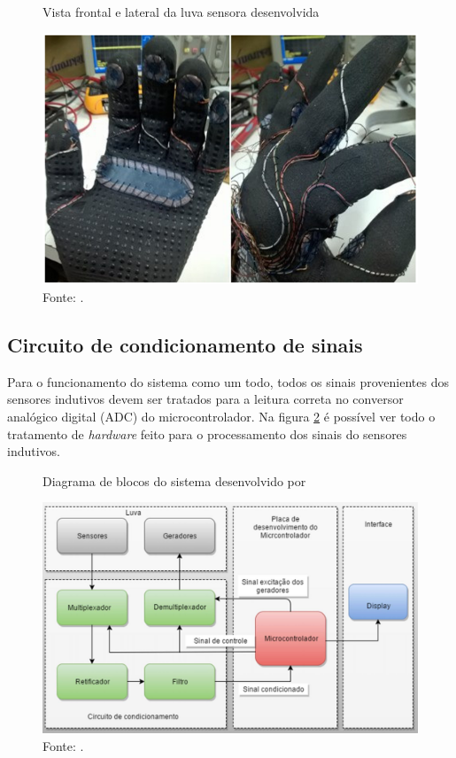	\begin{figure}[H]
		\vspace{4mm}
		\centering
		\caption{Vista frontal e lateral da luva sensora desenvolvida}
		\label{fig:luvaRuani}
		\includegraphics[scale=0.5]{imagens/luvaRuani.png}	
		\caption*{Fonte: .}		
	\end{figure}

	

\subsection{Circuito de condicionamento de sinais}
\label{sec:placa}
Para o funcionamento do sistema como um todo, todos os sinais provenientes dos sensores indutivos devem ser tratados para a  
leitura correta no conversor analógico digital (ADC) do microcontrolador.
Na figura \ref{fig:hard} é possível ver todo o tratamento de \textit{hardware} feito para o processamento dos sinais do sensores 
indutivos.

\begin{figure}[H]
	\vspace{4mm}
  	\centering
	\caption{Diagrama de blocos do sistema desenvolvido por }		
  	\label{fig:hard}	
  	\includegraphics[scale=0.3]{imagens/desc_luva_ruani.JPG}
  	\caption*{Fonte: .}
\end{figure}

